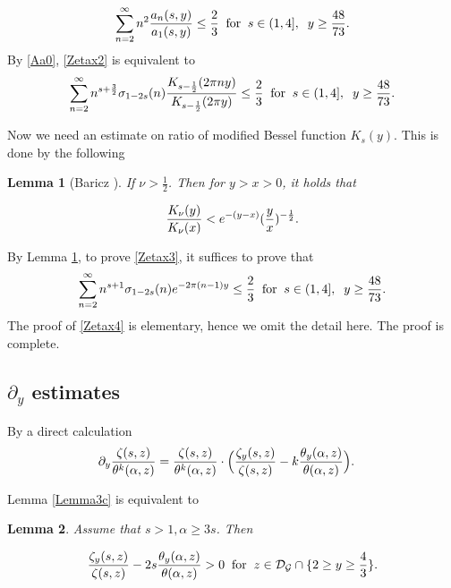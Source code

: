 \documentclass[reqno,english]{amsart}
\newtheorem{lemma}{Lemma}[section]
\newtheorem{open problem}{Open Problem}[section]
\newtheorem{open question}{Open Question}[section]
\newtheorem{open questions on hexagonal lattice}{Open Questions on hexagonal lattice}[section]
\begin{document}
\begin{equation}\aligned\label{Zetax2}
\sum_{n=2}^\infty n^2\frac{a_n(s,y)}{a_1(s,y)}\leq\frac{2}{3}\;\;\hbox{for}\;\; s\in(1,4],\;\; y\geq\frac{48}{73}.
\endaligned\end{equation}
By \eqref{Aa0}, \eqref{Zetax2} is equivalent to
\begin{equation}\aligned\label{Zetax3}
\sum_{n=2}^\infty n^{s+\frac{3}{2}}\sigma_{1-2s}(n)\frac{K_{s-\frac{1}{2}}(2\pi ny)}{K_{s-\frac{1}{2}}(2\pi y)}
\leq\frac{2}{3}\;\;\hbox{for}\;\; s\in(1,4],\;\; y\geq\frac{48}{73}.
\endaligned\end{equation}

Now we need an estimate on ratio of modified Bessel function $K_s(y)$. This is done by the following
\begin{lemma}[Baricz \cite{Bari2010}]\label{Lemma4.15} If $\nu>\frac{1}{2}$. Then for $y>x>0$, it holds that

 \begin{equation}\aligned\nonumber
\frac{K_\nu(y)}{K_\nu(x)}< e^{-(y-x)}(\frac{y}{x})^{-\frac{1}{2}}.
\endaligned\end{equation}

\end{lemma}

By Lemma \ref{Lemma4.15}, to prove \eqref{Zetax3}, it suffices to prove that
\begin{equation}\aligned\label{Zetax4}
\sum_{n=2}^\infty n^{s+1}\sigma_{1-2s}(n)e^{-2\pi(n-1)y}
\leq\frac{2}{3}\;\;\hbox{for}\;\; s\in(1,4],\;\; y\geq\frac{48}{73}.
\endaligned\end{equation}
The proof of \eqref{Zetax4} is elementary, hence we omit the detail here. The proof is complete.


\subsection{$\partial_y$ estimates}


By a direct calculation
\begin{equation}\aligned\nonumber
\partial_y\frac{\zeta(s,z)}{\theta^k(\alpha,z)}
&=\frac{\zeta(s,z)}{\theta^k(\alpha,z)}\cdot
\Big(
\frac{\zeta_y(s,z)}{\zeta(s,z)}-k\frac{\theta_y(\alpha,z)}{\theta(\alpha,z)}
\Big).
\endaligned\end{equation}

Lemma \ref{Lemma3c} is equivalent to

\begin{lemma}\label{Lemma4.16} Assume that $s>1, \alpha\geq 3s$. Then

\begin{equation}\aligned\nonumber
\frac{\zeta_y(s,z)}{\zeta(s,z)}-2s\frac{\theta_y(\alpha,z)}{\theta(\alpha,z)}>0\;\;\hbox{for}\;\;z\in\mathcal{D}_{\mathcal{G}}\cap\{2\geq y\geq \frac{4}{3}\}.
 \endaligned\end{equation}
\end{lemma}
\end{document}
